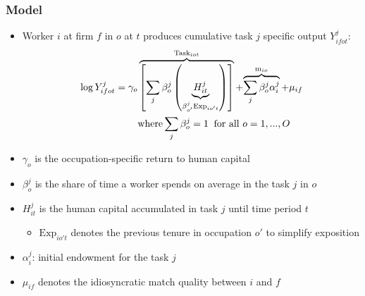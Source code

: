 \documentclass[10pt,svgnames,fragile]{beamer}
\begin{document}
\begin{frame}
	\frametitle{Model}
		\begin{itemize}
	\item Worker $i$ at firm $f$ in $o$ at $t$ produces cumulative task $j$ specific output $Y_{ifot}^j$:
	\begin{align}
		\log{Y_{ifot}^j} = \gamma_o&\overbrace{\left[  \sum_j \beta_{o}^j \left( \underbrace{H_{it}^{j}}_{\beta_{o'}^j \text{Exp}_{io't}}\right)  \right]}^{\text{Task}_{iot}} + {\overbrace{\sum_j \beta_{o}^j \alpha_{i}^j }^{\text{m}_{io}}+\mu_{if}}\\
		&\text{where} \sum_{j} \beta_{o}^j = 1 \;\;\text{for all }o=1,...,O \notag
	\end{align}

		\item $\gamma_o$ is the occupation-specific return to human capital
		\item $\beta_{o}^{j} $ is the share of time a worker spends on average in the task $j$ in  $o$
		\item $H_{it}^j$ is the human capital accumulated in task $j$ until time period $t$
		\begin{itemize}
			\item $\text{Exp}_{io't}$ denotes the previous tenure in occupation $o'$ to simplify exposition
		\end{itemize}
		\item  $\alpha_{i}^j$: initial endowment for the task $j$
		\item $\mu_{if}$ denotes the idiosyncratic match quality between $i$ and $f$ 
	
		\end{itemize}
	
\end{frame}
\end{document}
